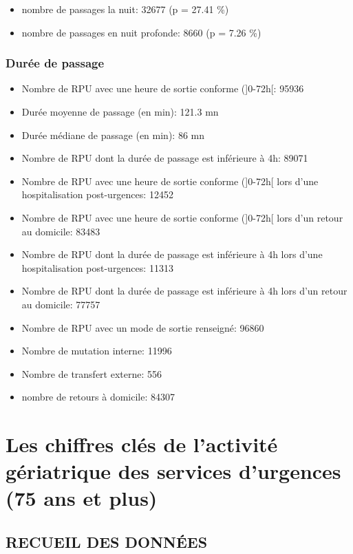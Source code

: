 \documentclass[]{article}
\begin{document}
\begin{itemize}
\itemsep1pt\parskip0pt
\item
  nombre de passages la nuit: 32677 (p = 27.41 \%)
\item
  nombre de passages en nuit profonde: 8660 (p = 7.26 \%)
\end{itemize}

\subsubsection{Durée de passage}\label{duree-de-passage}

\begin{itemize}
\item
  Nombre de RPU avec une heure de sortie conforme ({]}0-72h{[}: 95936
\item
  Durée moyenne de passage (en min): 121.3 mn
\item
  Durée médiane de passage (en min): 86 mn
\item
  Nombre de RPU dont la durée de passage est inférieure à 4h: 89071
\item
  Nombre de RPU avec une heure de sortie conforme ({]}0-72h{[} lors
  d'une hospitalisation post-urgences: 12452
\item
  Nombre de RPU avec une heure de sortie conforme ({]}0-72h{[} lors d'un
  retour au domicile: 83483
\item
  Nombre de RPU dont la durée de passage est inférieure à 4h lors d'une
  hospitalisation post-urgences: 11313
\item
  Nombre de RPU dont la durée de passage est inférieure à 4h lors d'un
  retour au domicile: 77757
\item
  Nombre de RPU avec un mode de sortie renseigné: 96860
\item
  Nombre de mutation interne: 11996
\item
  Nombre de transfert externe: 556
\item
  nombre de retours à domicile: 84307
\end{itemize}

\section{Les chiffres clés de l'activité gériatrique des services
d'urgences (75 ans et
plus)}\label{les-chiffres-cles-de-lactivite-geriatrique-des-services-durgences-75-ans-et-plus}

\subsection{RECUEIL DES DONNÉES}\label{recueil-des-donnees-2}
\end{document}
